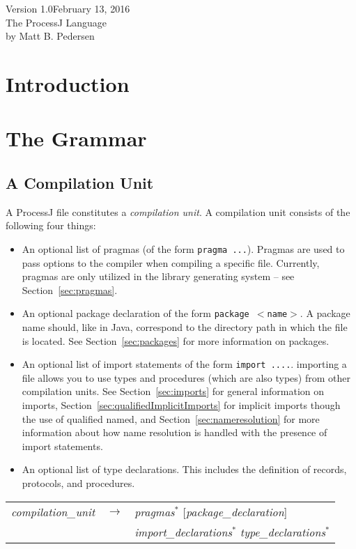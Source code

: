 \documentclass[pdflatex,11pt,letter]{article}
\begin{document}
\begin{center}
Version 1.0\hfill{}February 13, 2016\\[0.5cm]
{\Huge The ProcessJ Language}\\[0.5cm]
by Matt B. Pedersen
\end{center}

\section{Introduction}


\section{The Grammar}

\subsection{A Compilation Unit}

A ProcessJ file constitutes a {\em compilation unit}. A compilation unit consists of the following four things:
\begin{itemize}
\item An optional list of pragmas (of the form {\tt pragma ...}). Pragmas are used to pass options to the compiler when compiling a specific file. Currently, pragmas are only utilized in the library generating system -- see Section~\ref{sec:pragmas}.
\item An optional package declaration of the form {\tt package $<$name$>$}. A package name should, like in Java, correspond to the directory path in which the file is located. See Section~\ref{sec:packages} for more information on packages.
\item An optional list of import statements of the form {\tt import ....}. importing a file allows you to use types and procedures (which are also types) from other compilation units. See Section~\ref{sec:imports} for general information on imports, Section~\ref{sec:qualifiedImplicitImports} for implicit imports though the use of qualified named, and Section~\ref{sec:nameresolution} for more information about how name resolution is handled with the presence of import statements.
\item An optional list of type declarations. This includes the definition of records, protocols, and procedures.  
\end{itemize}

\begin{tabular}{lll}
{\it compilation\_unit} &  $\rightarrow$ &  
          {\it pragmas}$^*$ [{\it package\_declaration}]\\
          &&  {\it import\_declarations}$^*$ {\it type\_declarations}$^*$\\
\end{tabular}
\end{document}
